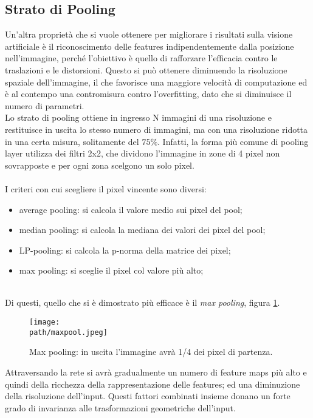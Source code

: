 \subsection{Strato di Pooling}
\label{subsec:pooling}
Un'altra proprietà che si vuole ottenere per migliorare i risultati sulla visione artificiale è il riconoscimento delle features indipendentemente dalla posizione nell'immagine, perché
l'obiettivo è quello di rafforzare l'efficacia contro le
traslazioni e le distorsioni. Questo si può ottenere diminuendo la risoluzione spaziale dell'immagine, il che favorisce una maggiore velocità di computazione ed è al contempo una contromisura contro l'overfitting, dato che si diminuisce il numero di parametri.\\ 
Lo strato di pooling ottiene in ingresso N immagini di una risoluzione e restituisce in uscita lo stesso numero di immagini, ma con una risoluzione ridotta in una certa misura, solitamente del $75\%$. Infatti, la forma più comune di pooling layer utilizza dei filtri 2x2, che dividono l'immagine in zone di 4 pixel non sovrapposte e per ogni zona scelgono un solo pixel. \\
\\
I criteri con cui scegliere il pixel vincente sono diversi:
\begin{itemize}
\item average pooling: si calcola il valore medio sui pixel del pool;
\item median pooling: si calcola la mediana dei valori dei pixel del pool;
\item LP-pooling: si calcola la p-norma della matrice dei pixel;
\item max pooling: si sceglie il pixel col valore più alto; 
\end{itemize}
\\
Di questi, quello che si è dimostrato più efficace è il \emph{max pooling}, figura \ref{fig:maxpool}.
\begin{figure}[h!]
 \centering
 \texttt{[image: \\path/maxpool.jpeg]} 
 \caption{Max pooling: in uscita l'immagine avrà 1/4 dei pixel di partenza.}
 \label{fig:maxpool}
\end{figure}
Attraversando la rete si avrà gradualmente un numero di feature maps  più alto e quindi della ricchezza della rappresentazione delle features; ed una diminuzione della risoluzione dell'input. Questi fattori combinati insieme donano un forte grado di invarianza alle trasformazioni geometriche dell'input.
 
